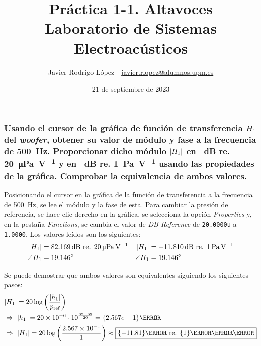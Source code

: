 \documentclass[10pt]{article}
\title{\Huge Práctica 1-1. Altavoces \\\huge Laboratorio de Sistemas Electroacústicos}
\author{Javier Rodrigo López - \href{mailto:javier.rlopez@alumnos.upm.es}{javier.rlopez@alumnos.upm.es}}
\date{21 de septiembre de 2023}
\begin{document}
\maketitle

\subsubsection{\texorpdfstring{Usando el cursor de la gráfica de función de transferencia $H_1$ del \textit{woofer}, obtener su valor de módulo y fase a la frecuencia de \SI{500}{\Hz}. Proporcionar dicho módulo $\abs{H_1}$ en \SI{}{\dB} re. \SI{20}{\micro\pascal\per\volt} y en \SI{}{\dB} re. \SI{1}{\pascal\per\volt} usando las propiedades de la gráfica. Comprobar la equivalencia de ambos valores.}{Pregunta 1}}

Posicionando el cursor en la gráfica de la función de transferencia a la frecuencia de \SI{500}{\Hz}, se lee el módulo y la fase de esta. Para cambiar la presión de referencia, se hace clic derecho en la gráfica, se selecciona la opción \textit{Properties} y, en la pestaña \textit{Functions}, se cambia el valor de \textit{DB Reference} de \verb|20.0000u| a \verb|1.0000|. Los valores leídos son los siguientes:
\begin{align*}
  \abs{H_1}   & = \SI{82.169}{\dB} \text{ re. } \SI{20}{\micro\pascal\per\volt} & \abs{H_1}   & = \SI{-11.810}{\dB} \text{ re. } \SI{1}{\pascal\per\volt} \\
  \angle{H_1} & = \SI{19.146}{\degree}                                          & \angle{H_1} & = \SI{19.146}{\degree}
\end{align*}

Se puede demostrar que ambos valores son equivalentes siguiendo los siguientes pasos:
\begin{align*}
   & \abs{H_1} = 20 \log \left( \frac{\abs{h_1}}{p _{\textnormal{ref}}} \right)
  \\ & \Rightarrow \  \abs{h_1} = \num{20e-6} \cdot 10^{\frac{82.169}{20}} = \qty{2.567e-1}{\pascal}
  \\ &\Rightarrow \ \abs{H_1} = 20 \log \left( \frac{\num{2.567e-1}}{1} \right) \approx \boxed{\qty{-11.81}{\dB} \text{ re. } \qty{1}{\pascal \per \volt}}
\end{align*}
\end{document}
